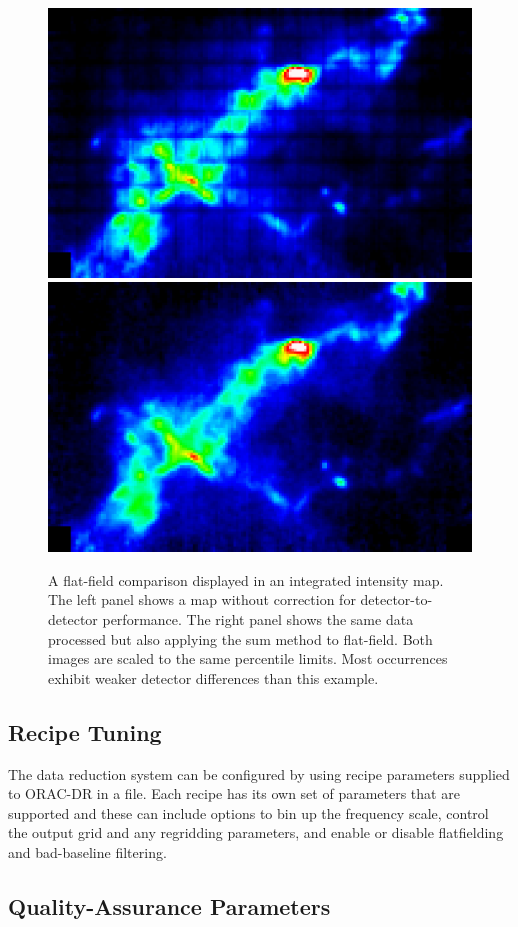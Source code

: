 \documentclass[useAMS,usenatbib]{mn2e}
\begin{document}
\begin{figure}
\includegraphics[width=0.495\columnwidth]{12CO_L1455_noflat.png}
\includegraphics[width=0.495\columnwidth]{12CO_L1455_flat.png}
\caption{A flat-field comparison displayed in an integrated intensity
  map.  The left panel shows a map without correction for
  detector-to-detector performance.  The right panel shows the same
  data processed but also applying the sum method to flat-field.  Both
  images are scaled to the same percentile limits.  Most occurrences
  exhibit weaker detector differences than this example.}
\label{fig:flatfield:results}
\end{figure}


\subsection{Recipe Tuning}

The data reduction system can be configured by using recipe parameters
supplied to ORAC-DR in a file. Each recipe has its own set of
parameters that are supported and these can include options to bin up
the frequency scale, control the output grid and any regridding
parameters, and enable or disable flatfielding and bad-baseline filtering.

\subsection{Quality-Assurance Parameters \label{sec:qa}}
\end{document}
